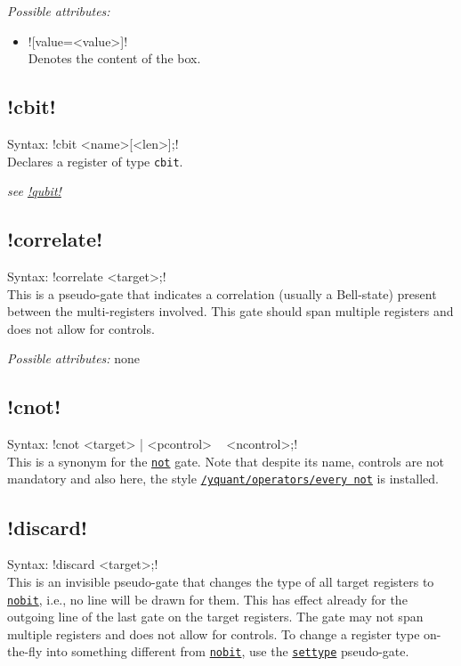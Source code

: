 \documentclass{scrartcl}
\def\gate#1{\hyperref[gate:#1]{\texttt{#1}}}
\def\style#1{\hyperref[style:#1]{\texttt{#1}}}
\begin{document}
         \emph{Possible attributes:}
         \begin{itemize}
            \item \yquant![value=<value>]! \\
               Denotes the content of the box.
         \end{itemize}

      \subsection{\texorpdfstring{\yquant!cbit!}{cbit}}\label{gate:cbit}
         Syntax: \yquant!cbit <name>[<len>];! \\
         Declares a register of type \texttt{cbit}.

         \emph{see \hyperref[gate:qubit]{\yquant!qubit!}}

      \subsection[\texorpdfstring{\yquant!correlate!}{correlate}]{\yquant!correlate!}\label{gate:correlate}
         Syntax: \yquant!correlate <target>;! \\
         This is a pseudo\hyp gate that indicates a correlation (usually a Bell\hyp state) present between the multi\hyp registers involved.
         This gate should span multiple registers and does not allow for controls.

         \emph{Possible attributes:} none

      \subsection{\texorpdfstring{\yquant!cnot!}{cnot}}\label{gate:cnot}
         Syntax: \yquant!cnot <target> | <pcontrol> ~ <ncontrol>;! \\
         This is a synonym for the \gate{not} gate.
         Note that despite its name, controls are not mandatory and also here, the style \style{/yquant/operators/every not} is installed.

      \subsection{\texorpdfstring{\yquant!discard!}{discard}}\label{gate:discard}
         Syntax: \yquant!discard <target>;! \\
         This is an invisible pseudo\hyp gate that changes the type of all target registers to \gate{nobit}, i.e., no line will be drawn for them.
         This has effect already for the outgoing line of the last gate on the target registers.
         The gate may not span multiple registers and does not allow for controls.
         To change a register type on\hyp the\hyp fly into something different from \gate{nobit}, use the \gate{settype} pseudo\hyp gate.
\end{document}
